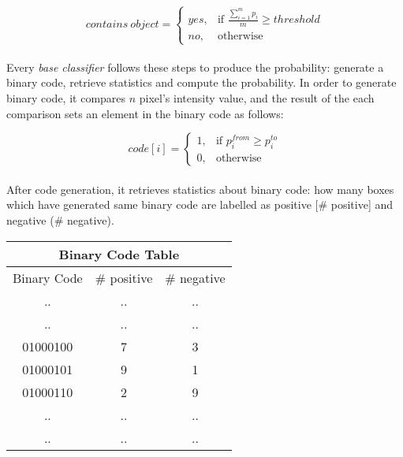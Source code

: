 \documentclass{report}
\begin{document}
            \[
                contains\ object =
                \begin{cases}
                    yes, & \text{if } \frac {\sum\limits_{i=1}^m {p_{i}}} {m} \geq threshold \\
                    no , & \text{otherwise}
                \end{cases}
            \]

        \paragraph{}
            Every \textit{base classifier} follows these steps to produce the probability: generate a binary code, retrieve statistics
            and compute the probability. In order to generate binary code, it compares $n$ pixel's intensity value, and the result of the
            each comparison sets an element in the binary code as follows:

            \[
                code[i] =
                \begin{cases}
                    1, & \text{if } p^{from}_{i} \geq p^{to}_{i} \\
                    0 , & \text{otherwise}
                \end{cases}
            \]

        \paragraph{}
            After code generation, it retrieves statistics about binary code: how many boxes which have generated
            same binary code are labelled as positive [\# positive] and negative (\# negative).
            \begin{center}
                \begin{tabular}{ | c | c | c | }

                      \hline
                      \multicolumn{3}{|c|}{ Binary Code Table} \\
                      \hline
                      Binary Code & \# positive & \# negative \\
                      \hline
                      .. & .. & .. \\
                      .. & .. & .. \\
                      01000100 & 7 & 3 \\
                      01000101 & 9 & 1 \\
                      01000110 & 2 & 9 \\
                      .. & .. & .. \\
                      .. & .. & .. \\
                      \hline
                \end{tabular}
            \end{center}
            
\end{document}
